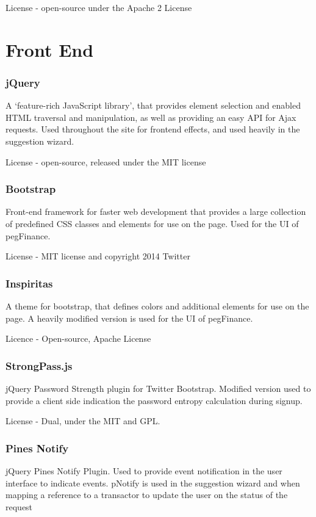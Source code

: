 \begin{appendices}
License - open-source under the Apache 2 License

\section{Front End}
\subsubsection{jQuery}
A `feature-rich JavaScript library', that provides element selection and enabled HTML traversal and manipulation, as well as providing an easy API for Ajax requests.
%
Used throughout the site for frontend effects, and used heavily in the suggestion wizard.

License - open-source, released under the MIT license

\subsubsection{Bootstrap}
Front-end framework for faster web development that provides a large collection of predefined CSS classes and elements for use on the page.
%
Used for the UI of pegFinance.

License - MIT license and copyright 2014 Twitter

\subsubsection{Inspiritas}
A theme for bootstrap, that defines colors and additional elements for use on the page.
%
A heavily modified version is used for the UI of pegFinance.

Licence - Open-source, Apache License

\subsubsection{StrongPass.js}
jQuery Password Strength plugin for Twitter Bootstrap.
%
Modified version used to provide a client side indication the password entropy calculation during signup.

License - Dual, under the MIT and GPL.

\subsubsection{Pines Notify}
jQuery Pines Notify Plugin. Used to provide event notification in the user interface to indicate events.
%
pNotify is used in the suggestion wizard and when mapping a reference to a transactor to update the user on the status of the request


\end{appendices}

